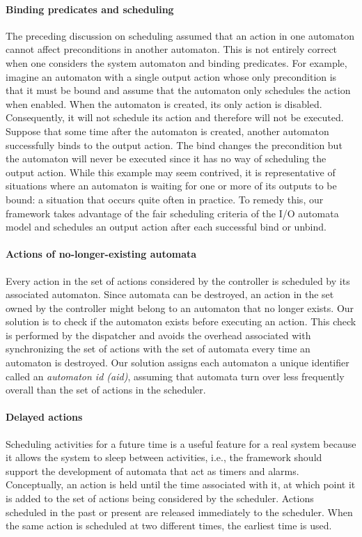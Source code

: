 \paragraph*{Binding predicates and scheduling}
The preceding discussion on scheduling assumed that an action in one automaton cannot affect preconditions in another automaton.
This is not entirely correct when one considers the system automaton and binding predicates.
For example, imagine an automaton with a single output action whose only precondition is that it must be bound and assume that the automaton only schedules the action when enabled.
When the automaton is created, its only action is disabled.
Consequently, it will not schedule its action and therefore will not be executed.
Suppose that some time after the automaton is created, another automaton successfully binds to the output action.
The bind changes the precondition but the automaton will never be executed since it has no way of scheduling the output action.
While this example may seem contrived, it is representative of situations where an automaton is waiting for one or more of its outputs to be bound: a situation that occurs quite often in practice.
To remedy this, our framework takes advantage of the fair scheduling criteria of the I/O automata model and schedules an output action after each successful bind or unbind.

\paragraph*{Actions of no-longer-existing automata}
Every action in the set of actions considered by the controller is scheduled by its associated automaton.
Since automata can be destroyed, an action in the set owned by the controller might belong to an automaton that no longer exists.
Our solution is to check if the automaton exists before executing an action.
This check is performed by the dispatcher and avoids the overhead associated with synchronizing the set of actions with the set of automata every time an automaton is destroyed.
Our solution assigns each automaton a unique identifier called an \emph{automaton id (aid)}, assuming that automata turn over less frequently overall than the set of actions in the scheduler.

\paragraph*{Delayed actions}
Scheduling activities for a future time is a useful feature for a real system because it allows the system to sleep between activities, i.e., the framework should support the development of automata that act as timers and alarms.
Conceptually, an action is held until the time associated with it, at which point it is added to the set of actions being considered by the scheduler.
Actions scheduled in the past or present are released immediately to the scheduler.
When the same action is scheduled at two different times, the earliest time is used.

